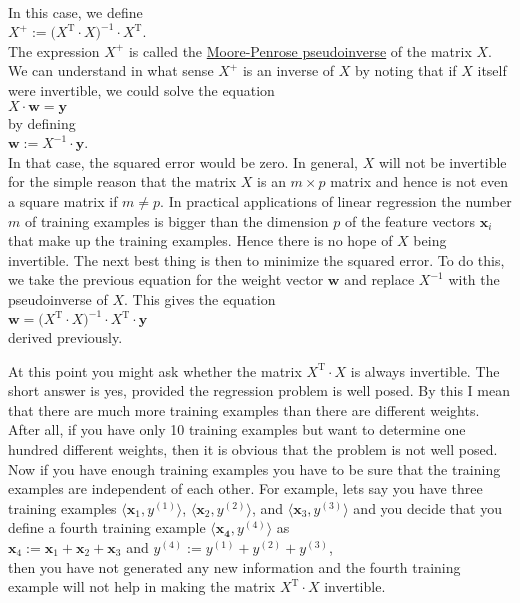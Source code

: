 \\[0.2cm]
In this case, we define 
\\[0.2cm]
\hspace*{1.3cm}
$X^+ := \bigl(X^\textrm{T} \cdot X)^{-1} \cdot X^\textrm{T}$.
\\[0.2cm]
The expression $X^+$ is called the 
\href{https://en.wikipedia.org/wiki/Moore–Penrose_pseudoinverse}{Moore-Penrose pseudoinverse} of the matrix $X$.
We can understand in what sense $X^+$ is an inverse of $X$ by noting that if $X$ itself were invertible, we could solve
the equation
\\[0.2cm]
\hspace*{1.3cm}
$X \cdot \mathbf{w} = \mathbf{y}$
\\[0.2cm]
by defining
\\[0.2cm]
\hspace*{1.3cm}
$\mathbf{w} := X^{-1} \cdot \mathbf{y}$.
\\[0.2cm]
In that case, the squared error would be zero.
In general, $X$ will not be invertible for the simple reason that the matrix $X$ is an $m \times p$ matrix and hence is
not even a square matrix if $m \not= p$.  In practical applications of linear regression the number $m$ of training
examples is bigger than the dimension $p$ of the feature vectors $\mathbf{x}_i$ that make up the training examples.  Hence there
is no hope of $X$ being invertible.  The next best thing is then to minimize the squared error.  To do this, we take the
previous equation for the weight vector $\mathbf{w}$ and replace $X^{-1}$ with the pseudoinverse of $X$.  This gives the
equation 
\\[0.2cm]
\hspace*{1.3cm}
$\mathbf{w} = \bigl(X^\textrm{T} \cdot X)^{-1} \cdot X^\textrm{T} \cdot \mathbf{y}$
\\[0.2cm]
derived previously.

At this point you might ask whether the matrix $X^\textrm{T} \cdot X$ is always invertible.  The short answer is yes, provided the
regression problem is well posed.  By this I mean that there are much more training examples than there are different
weights.  After all, if you have only 10 training examples but want to determine one hundred different weights,
then it is obvious that the problem is not well posed.  Now if you have enough training examples you have to be
sure that the training examples are independent of each other.  For example, lets say you have three training examples 
$\langle\mathbf{x}_1, y^{(1)}\rangle$, $\langle\mathbf{x}_2, y^{(2)}\rangle$, and $\langle\mathbf{x}_3, y^{(3)}\rangle$ and
you decide that you define a fourth training example $\langle\mathbf{x_4}, y^{(4)}\rangle$ as
\\[0.2cm]
\hspace*{1.3cm}
$\mathbf{x}_4 := \mathbf{x}_1 + \mathbf{x}_2 + \mathbf{x}_3$ \quad and \quad 
$y^{(4)} := y^{(1)} + y^{(2)} + y^{(3)}$,
\\[0.2cm]
then you have not generated any new information and the fourth training example will not help in making the matrix 
$X^\textrm{T} \cdot X$ invertible.

